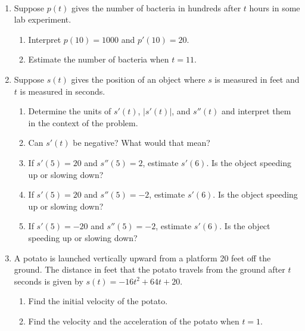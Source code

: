 \documentclass[11pt,fleqn]{article}
\begin{document}
\renewcommand{\headrulewidth}{0pt}
\newcommand{\blank}[1]{\rule{#1}{0.75pt}}
\newcommand{\bc}{\begin{center}}
\newcommand{\ec}{\end{center}}
\renewcommand{\d}{\displaystyle}

\vspace*{-0.7in}

\begin{center}
  \large
  \\
\end{center}
\begin{enumerate}
\item Suppose $p(t)$ gives the number of bacteria in hundreds after $t$ hours in some lab experiment. 
	\begin{enumerate}
	\item  Interpret $p(10)=1000$ and $p'(10)=20.$
	\vfill
	\item Estimate the number of bacteria when $t=11.$
	\vfill
	\end{enumerate}
\item Suppose $s(t)$ gives the position of an object where $s$ is measured in feet and $t$ is measured in seconds.\\
	\begin{enumerate}
	\item  Determine the units of $s'(t)$, $|s'(t)|$, and $s''(t)$ and interpret them in the context of the problem.
	\vfill
	\item Can $s'(t)$ be negative? What would that mean?
	\vfill
	\item If $s'(5)=20$ and $s''(5)=2$, estimate $s'(6).$ Is the object speeding up or slowing down?
	\vfill
	\item If $s'(5)=20$ and $s''(5)=-2$, estimate $s'(6).$ Is the object speeding up or slowing down?
	\vfill
	\item If $s'(5)=-20$ and $s''(5)=-2$, estimate $s'(6).$ Is the object speeding up or slowing down?
	\vfill
	\end{enumerate}
\newpage
\item A potato is launched vertically upward from a platform 20 feet off the ground. The distance in feet that the potato travels from the ground after $t$ seconds is given by $s(t)=-16t^2+64t+20.$
	\begin{enumerate}
	\item Find the initial velocity of the potato.
	\vfill
	\item Find the velocity and the acceleration of the potato when $t=1.$ 	\vfill

\end{enumerate}
\end{enumerate}
\end{document}
